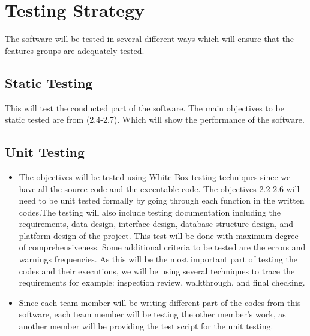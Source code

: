 \documentclass[12pt]{article}
\begin{document}
\section{Testing Strategy}
The software will be tested in several different ways which will ensure that the features groups are adequately tested. 
\subsection{Static Testing}
This will test the conducted part of the software. The main objectives to be static tested are from (2.4-2.7). Which will show the performance of the software. 
\subsection{Unit Testing}
\begin{itemize}
	\item The objectives will be tested using White Box testing techniques since we have all the source code and the executable code. The objectives 2.2-2.6 will need to be unit tested formally by going through each function in the written codes.The testing will also include testing documentation including the requirements, data design, interface design, database structure design, and platform design of the project.  This test will be done with maximum degree of comprehensiveness. Some additional criteria to be tested are the errors and warnings frequencies. As this will be the most important part of testing the codes and their executions, we will be using several techniques to trace the requirements for example: inspection review, walkthrough, and final checking. 
	\item Since each team member will be writing different part of the codes from this software, each team member will be testing the other member's work, as another member will be providing the test script for the unit testing. 
\end{itemize}
\end{document}
